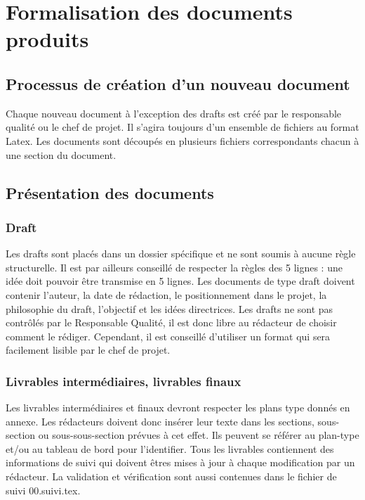 \section{Formalisation des documents produits}
\subsection{Processus de création d'un nouveau document}
Chaque nouveau document à l'exception des drafts est créé par le responsable 
qualité ou le chef de projet. Il s'agira toujours d'un ensemble de fichiers au 
format Latex.
Les documents sont découpés en plusieurs fichiers correspondants chacun à une
section du document.

\subsection{Présentation des documents}
\subsubsection{Draft}
Les drafts sont placés dans un dossier spécifique et ne sont soumis à aucune 
règle structurelle. Il est par ailleurs conseillé de respecter la règles des 
5 lignes : une idée doit pouvoir être transmise en 5 lignes.
Les documents de type draft doivent contenir l'auteur, la date de rédaction, 
le positionnement dans le projet, la philosophie du draft, l'objectif et les 
idées directrices.
Les drafts ne sont pas contrôlés par le Responsable Qualité, il est donc libre
au rédacteur de choisir comment le rédiger. Cependant, il est conseillé
d'utiliser un format qui sera facilement lisible par le chef de projet.

\subsubsection{Livrables intermédiaires, livrables finaux}
Les livrables intermédiaires et finaux devront respecter les plans type donnés 
en annexe.
Les rédacteurs doivent donc insérer leur texte dans les sections, sous-section
ou sous-sous-section prévues à cet effet. Ils peuvent se référer au plan-type
et/ou au tableau de bord pour l'identifier.
Tous les livrables contiennent des informations de suivi qui doivent êtres 
mises à jour à chaque modification par un rédacteur. La validation et 
vérification sont aussi contenues dans le fichier de suivi 00.suivi.tex.
